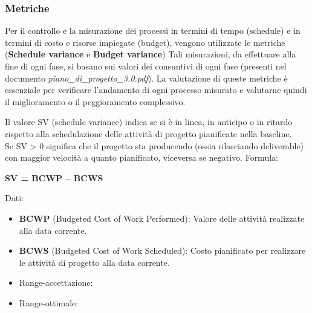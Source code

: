 \documentclass[a4paper,11pt]{article}
\begin{document}
\subsubsection{Metriche}
Per il controllo e la misurazione dei processi in termini di tempo (schedule) e in termini di costo e risorse impiegate (budget), vengono utilizzate le metriche (\textbf{Schedule variance} e \textbf{Budget variance}) 
Tali misurazioni, da effettuare alla fine di ogni fase, si basano sui valori dei consuntivi di ogni fase (presenti nel documento \textit{piano\_di\_progetto\_3.0.pdf}). La valutazione di queste metriche è essenziale per verificare l'andamento di ogni processo misurato e valutarne quindi il miglioramento o il peggioramento complessivo.

Il valore SV (schedule variance) indica se si è in linea, in anticipo o in ritardo rispetto alla schedulazione delle attività di progetto pianificate nella baseline.\\
Se SV > 0 significa che il progetto sta producendo (ossia rilasciando deliverable) con maggior velocità a quanto pianificato, viceversa se negativo.
Formula:
\begin{center}
\textbf{SV = BCWP – BCWS\\}
\end{center}
Dati:
\begin{itemize}
\item \textbf{BCWP} (Budgeted Cost of Work Performed): Valore delle attività realizzate alla data corrente.
\item \textbf{BCWS} (Budgeted Cost of Work Scheduled): Costo pianificato per realizzare le attività di progetto alla data corrente.
\end{itemize}
\begin{itemize}
	\item Range-accettazione: \begin{math} [ \ge -(PreventivoFase*5\%)]
	\end{math}
	\item Range-ottimale: \begin{math}[ \ge 0]\end{math}
	\end{itemize}
\end{document}
